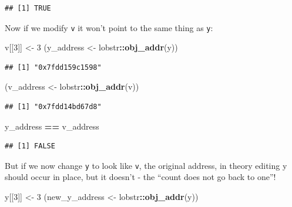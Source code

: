 \documentclass[]{book}
\newenvironment{Shaded}{\begin{snugshade}}{\end{snugshade}}
\newcommand{\DecValTok}[1]{\textcolor[rgb]{0.00,0.00,0.81}{#1}}
\newcommand{\KeywordTok}[1]{\textcolor[rgb]{0.13,0.29,0.53}{\textbf{#1}}}
\newcommand{\NormalTok}[1]{#1}
\newcommand{\OperatorTok}[1]{\textcolor[rgb]{0.81,0.36,0.00}{\textbf{#1}}}
\newcommand{\StringTok}[1]{\textcolor[rgb]{0.31,0.60,0.02}{#1}}
\begin{document}
\begin{verbatim}
## [1] TRUE
\end{verbatim}

Now if we modify \texttt{v} it won't point to the same thing as \texttt{y}:

\begin{Shaded}
\begin{Highlighting}[]
\NormalTok{v[[}\DecValTok{3}\NormalTok{]] <-}\StringTok{ }\DecValTok{3}
\NormalTok{(y_address <-}\StringTok{ }\NormalTok{lobstr}\OperatorTok{::}\KeywordTok{obj_addr}\NormalTok{(y))}
\end{Highlighting}
\end{Shaded}

\begin{verbatim}
## [1] "0x7fdd159c1598"
\end{verbatim}

\begin{Shaded}
\begin{Highlighting}[]
\NormalTok{(v_address <-}\StringTok{ }\NormalTok{lobstr}\OperatorTok{::}\KeywordTok{obj_addr}\NormalTok{(v))}
\end{Highlighting}
\end{Shaded}

\begin{verbatim}
## [1] "0x7fdd14bd67d8"
\end{verbatim}

\begin{Shaded}
\begin{Highlighting}[]
\NormalTok{y_address }\OperatorTok{==}\StringTok{ }\NormalTok{v_address}
\end{Highlighting}
\end{Shaded}

\begin{verbatim}
## [1] FALSE
\end{verbatim}

But if we now change \texttt{y} to look like \texttt{v}, the original address, in theory editing y should occur in place, but it doesn't - the ``count does not go back to one''!

\begin{Shaded}
\begin{Highlighting}[]
\NormalTok{y[[}\DecValTok{3}\NormalTok{]] <-}\StringTok{ }\DecValTok{3}
\NormalTok{(new_y_address <-}\StringTok{ }\NormalTok{lobstr}\OperatorTok{::}\KeywordTok{obj_addr}\NormalTok{(y))}
\end{Highlighting}
\end{Shaded}
\end{document}

